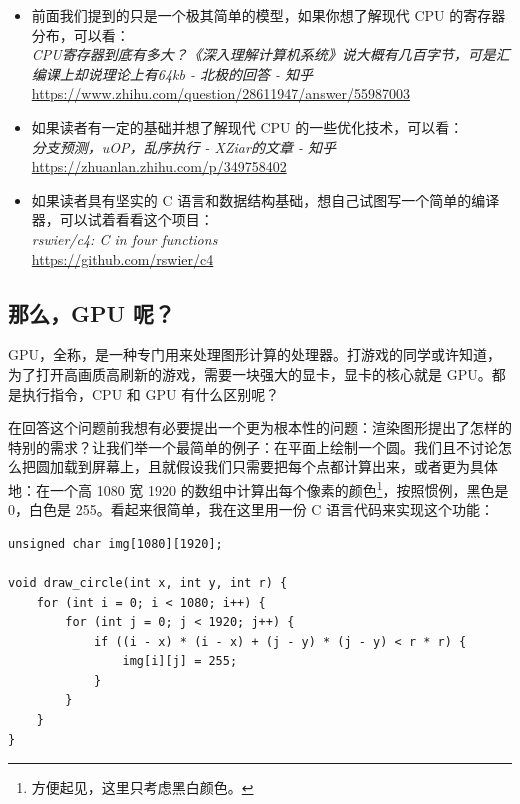 \begin{tcolorbox}[myrecommendbox, title=推荐阅读, breakable=false]
    \begin{itemize}
        \item 前面我们提到的只是一个极其简单的模型，如果你想了解现代 CPU 的寄存器分布，可以看：\\
              \textit{CPU寄存器到底有多大？《深入理解计算机系统》说大概有几百字节，可是汇编课上却说理论上有64kb - 北极的回答 - 知乎}\\
              \url{https://www.zhihu.com/question/28611947/answer/55987003}
        \item 如果读者有一定的基础并想了解现代 CPU 的一些优化技术，可以看：\\
              \textit{分支预测，uOP，乱序执行 - XZiar的文章 - 知乎}\\
              \url{https://zhuanlan.zhihu.com/p/349758402}
        \item 如果读者具有坚实的 C 语言和数据结构基础，想自己试图写一个简单的编译器，可以试着看看这个项目：\\
              \textit{rswier/c4: C in four functions}\\
              \url{https://github.com/rswier/c4}
    \end{itemize}
\end{tcolorbox}

\newpage

\subsection{那么，GPU 呢？}

GPU，全称，是一种专门用来处理图形计算的处理器。打游戏的同学或许知道，为了打开高画质高刷新的游戏，需要一块强大的显卡，显卡的核心就是 GPU。都是执行指令，CPU 和 GPU 有什么区别呢？

在回答这个问题前我想有必要提出一个更为根本性的问题：渲染图形提出了怎样的特别的需求？让我们举一个最简单的例子：在平面上绘制一个圆。我们且不讨论怎么把圆加载到屏幕上，且就假设我们只需要把每个点都计算出来，或者更为具体地：在一个高 1080 宽 1920 的数组中计算出每个像素的颜色\footnote{方便起见，这里只考虑黑白颜色。}，按照惯例，黑色是 0，白色是 255。看起来很简单，我在这里用一份 C 语言代码来实现这个功能：
\begin{verbatim}
unsigned char img[1080][1920];

void draw_circle(int x, int y, int r) {
    for (int i = 0; i < 1080; i++) {
        for (int j = 0; j < 1920; j++) {
            if ((i - x) * (i - x) + (j - y) * (j - y) < r * r) {
                img[i][j] = 255;
            }
        }
    }
}
\end{verbatim}

